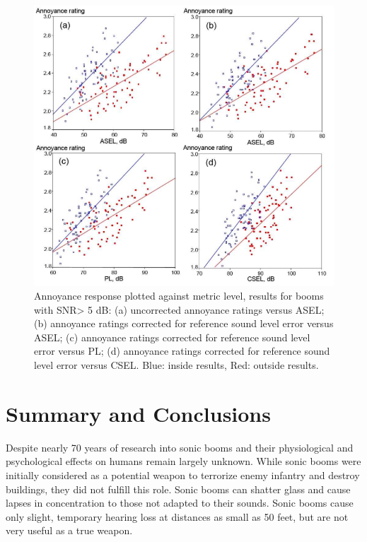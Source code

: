 \documentclass[]{aiaa-tc}%
\begin{document}
\begin{figure}[tb!]
  \centering
  \includegraphics[width=\textwidth]{figs/indoor-outdoor-comparison.png}
  \caption{Annoyance response plotted against metric level, results for booms with SNR> 5 dB: (a) uncorrected annoyance ratings versus ASEL; (b) annoyance ratings corrected for reference sound level error versus ASEL; (c) annoyance ratings corrected for reference sound level error versus PL; (d) annoyance ratings corrected for reference sound level error versus CSEL. Blue: inside results, Red: outside results.
 ~\cite{sullivan2010human}}
  \label{fig:indoor-outdoor-comparison}
\end{figure}

\section{Summary and Conclusions}
Despite nearly 70 years of research into sonic booms and their physiological and psychological effects on humans remain largely unknown. While sonic booms were initially considered as a potential weapon to terrorize enemy infantry and destroy buildings, they did not fulfill this role. Sonic booms can shatter glass and cause lapses in concentration to those not adapted to their sounds. Sonic booms cause only slight, temporary hearing loss at distances as small as 50 feet, but are not very useful as a true weapon.
\end{document}

